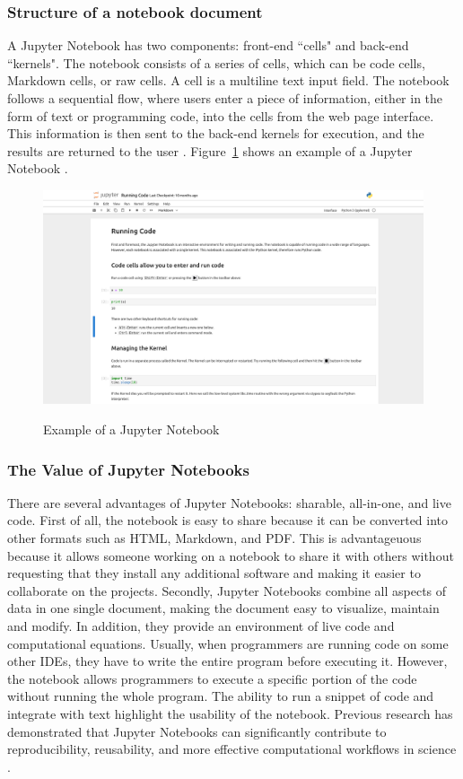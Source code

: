 \subsubsection{Structure of a notebook document}
A Jupyter Notebook has two components: front-end ``cells" and back-end 
``kernels". The notebook consists of a series of cells, which can be code 
cells, Markdown cells, or raw cells. A cell is a multiline text input field. 
The notebook follows a sequential flow, where users enter a piece of 
information, either in the form of text or programming code, into the cells 
from the web page interface. This information is then sent to the back-end 
kernels for execution, and the results are returned to the user 
\cite{notebookdoc}. Figure~\ref{fig:running_code} shows an example of a
Jupyter Notebook \cite{jupyternotebookrep}.

\begin{figure}[h!]
	\caption{Example of a Jupyter Notebook}
	\includegraphics[width=1\textwidth]{figures/running_code.png}
	\label{fig:running_code}
\end{figure}

\subsubsection{The Value of Jupyter Notebooks}
There are several advantages of Jupyter Notebooks: sharable, all-in-one, and 
live code. First of all, the notebook is easy to share because it can be 
converted into other formats such as HTML, Markdown, and PDF. This is 
advantageuous because it allows someone working on a notebook to share it with 
others without requesting that they install any additional software and making 
it easier to collaborate on the projects. Secondly, Jupyter Notebooks combine 
all aspects of data in one single document, making the document easy to 
visualize, maintain and modify. In addition, they provide an environment of 
live code and computational equations. Usually, when programmers are running 
code on some other IDEs, they have to write the entire program before executing 
it. However, the notebook allows programmers to execute a specific portion of 
the code without running the whole program. The ability to run a snippet of 
code and integrate with text highlight the usability of the notebook. Previous 
research has demonstrated that Jupyter Notebooks can significantly contribute 
to reproducibility, reusability, and more effective computational workflows in 
science \cite{beg2021using}.

